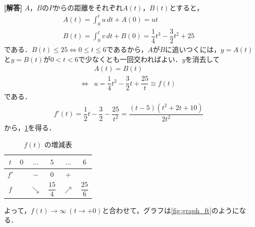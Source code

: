 \documentclass[../../main.tex]{subfiles}
\begin{document}
\begin{oframed}
  
\end{oframed}

{\bf [解答]}
$A$，$B$の$P$からの距離をそれぞれ$A(t)$，$B(t)$とすると，
\begin{align}
  A(t)=\int_0^t u\,dt+A(0)=ut \\
  B(t)=\int_0^t v\,dt+B(0)=\dfrac{1}{4}t^3-\dfrac{3}{2}t^2+25
\end{align}
である．$B(t)\le25\iff0\le t\le6$であるから，$A$が$B$に追いつくには，$y=A(t)$と$y=B(t)$が$0<t<6$で少なくとも一回交わればよい．$y$を消去して
\begin{align}
  &A(t)=B(t) \nonumber \\
  \iff &u=\dfrac{1}{4}t^2-\dfrac{3}{2}t+\dfrac{25}{t}\equiv f(t) \label{eq:1}
\end{align}
である．
\begin{align}
  f'(t)=\dfrac{1}{2}t-\dfrac{3}{2}-\dfrac{25}{t^2}=\dfrac{(t-5)(t^2+2t+10)}{2t^2}
\end{align}
から，\cref{tab:variation_ft}を得る．

\begin{table}[htb]
  \centering
  \caption{$f(t)$ の増減表}
  \label{tab:variation_ft}
  \begin{tabular}{c|c|c|c|c|c}
    $t$  & $0$ & $\dots$ & $5$ & $\dots$ & $6$ \\ \hline
    $f'$ &     & $-$     & $0$ & $+$     &     \\ \hline
    $f$  &     & $\searrow$ & $\dfrac{15}{4}$ & $\nearrow$ & $\dfrac{25}{6}$
  \end{tabular}
\end{table}

よって，$f(t)\to\infty\ (t\to+0)$と合わせて，グラフは\cref{fig:graph_ft}のようになる．
\end{document}

